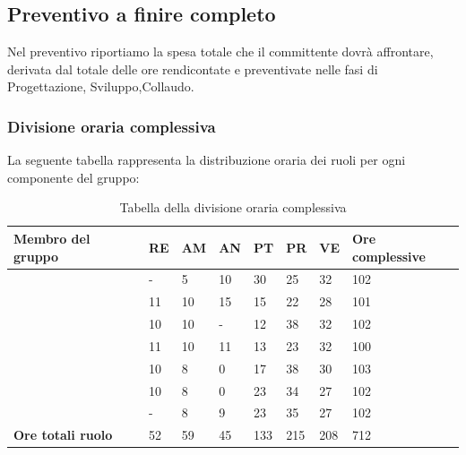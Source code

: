 \subsection{Preventivo a finire completo} 
Nel preventivo riportiamo la spesa totale che il committente dovrà affrontare, derivata dal totale delle ore rendicontate e preventivate nelle fasi di Progettazione, Sviluppo,Collaudo.

\subsubsection{Divisione oraria complessiva} 
La seguente tabella rappresenta la distribuzione oraria dei ruoli per ogni componente del gruppo:
{
\renewcommand{\arraystretch}{2}
\begin{longtable}[h!] { C{3.5cm} C{1cm} C{1cm} C{1cm} C{1cm} C{1cm} C{1cm} C{2cm}}
\caption{Tabella della divisione oraria complessiva}	\\
\rowcolor{\primaryColor}

\textcolor{\secondaryColor}{\textbf{Membro del gruppo}} & 
\textcolor{\secondaryColor}{\textbf{RE}} & 
\textcolor{\secondaryColor}{\textbf{AM}} & 
\textcolor{\secondaryColor}{\textbf{AN}} & 
\textcolor{\secondaryColor}{\textbf{PT}} & 
\textcolor{\secondaryColor}{\textbf{PR}} & 
\textcolor{\secondaryColor}{\textbf{VE}} & 
\textcolor{\secondaryColor}{\textbf{Ore complessive}}\\	
\endhead

\AW{}                     & - & 5 & 10 & 30 & 25 & 32 & 102 \\
\AT{}                     & 11 & 10 & 15 & 15 & 22 & 28 & 101 \\
\AD{}                     & 10 & 10 & - & 12 & 38 & 32 & 102 \\
\EC{}                     & 11 & 10 &  11 & 13 & 23 & 32 & 100 \\
\EM{}                     & 10 & 8  &  0 & 17 & 38 & 30 & 103 \\
\FP{}                     & 10 & 8  &  0 & 23 & 34 & 27 & 102 \\
\GG{}                     &  - & 8  & 9 & 23 & 35 & 27 & 102 \\
\textbf{Ore totali ruolo} & 52  & 59 & 45 & 133 & 215 & 208 & 712 \\
\end{longtable}
}

